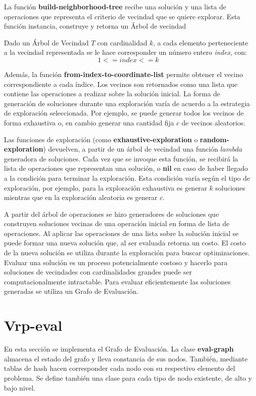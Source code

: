 La función \textbf{build-neighborhood-tree} recibe una solución y una lista de operaciones que representa el criterio de vecindad que se quiere explorar. Esta función instancia, construye y retorna un Árbol de vecindad

Dado un Árbol de Vecindad $T$ con cardinalidad $k$, a cada elemento perteneciente a la vecindad representada se le hace corresponder un número entero \textit{index}, con:
$$
1 <= index <= k
$$

Además, la función \textbf{from-index-to-coordinate-list} permite obtener el vecino correspondiente a cada índice. Los vecinos son retornados como una lista que contiene las operaciones a realizar sobre la solución inicial. La forma de generación de soluciones durante una exploración varía de acuerdo a la estrategia de exploración seleccionada. Por ejemplo, se puede generar todos los vecinos de forma exhaustiva o, en cambio generar una cantidad fija $c$ de vecinos aleatorios. 

Las funciones de exploración (como \textbf{exhaustive-exploration} o \textbf{random-exploration}) devuelven, a partir de un árbol de vecindad una función $lambda$ generadora de soluciones. Cada vez que se invoque esta función, se recibirá la lista de operaciones que representan una solución, o \textbf{nil} en caso de haber llegado a la condición para terminar la exploración. Esta condición varía según el tipo de exploración, por ejemplo, para la exploración exhaustiva es generar $k$ soluciones mientras que en la exploración aleatoria es generar $c$. 

A partir del árbol de operaciones se hizo generadores de soluciones que construyen soluciones vecinas de una operación inicial en forma de lista de operaciones. Al aplicar las operaciones de una lista sobre la solución inicial se puede formar una nueva solución que, al ser evaluada retorna un costo. El costo de la nueva solución se utiliza durante la exploración para buscar optimizaciones. Evaluar una solución es un proceso potencialmente costoso y hacerlo para soluciones de vecindades con cardinalidades grandes puede ser computacionalmente intractable. Para evaluar eficientemente las soluciones generadas se utiliza un Grafo de Evaluación.

\section{Vrp-eval}\label{2-eval}
En esta sección se implementa el Grafo de Evaluación. La clase \textbf{eval-graph} almacena el estado del grafo y lleva constancia de sus nodos. También, mediante tablas de hash hacen corresponder cada nodo con su respectivo elemento del problema. Se define también una clase para cada tipo de nodo existente, de alto y bajo nivel.

